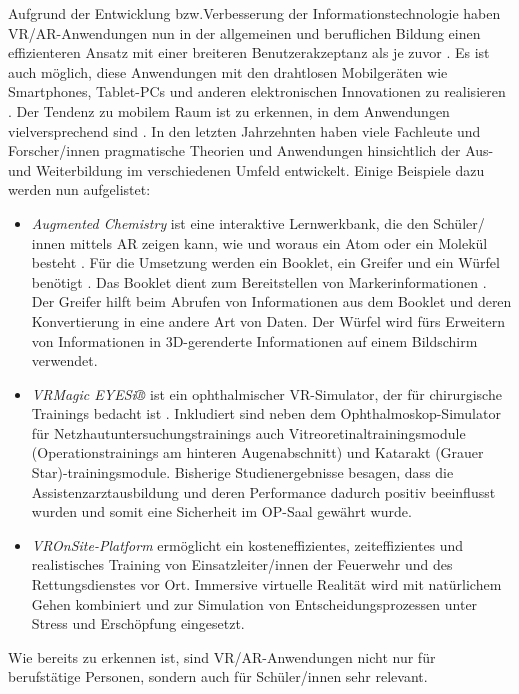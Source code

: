 \documentclass[deutsch]{llncs}
\begin{document}
Aufgrund der Entwicklung bzw.Verbesserung der Informationstechnologie haben VR/AR-Anwendungen nun in der allgemeinen und beruflichen Bildung einen effizienteren Ansatz mit einer breiteren Benutzerakzeptanz als je zuvor \cite{Edu}. Es ist auch möglich, diese Anwendungen mit den drahtlosen Mobilgeräten wie Smartphones, Tablet-PCs und anderen elektronischen Innovationen zu realisieren \cite{Edu}. Der Tendenz zu mobilem Raum ist zu erkennen, in dem Anwendungen vielversprechend sind \cite{Edu}.
In den letzten Jahrzehnten haben viele Fachleute und Forscher/innen pragmatische Theorien und Anwendungen hinsichtlich der Aus- und Weiterbildung im verschiedenen Umfeld entwickelt\cite{Edu}. Einige Beispiele dazu werden nun aufgelistet:
\begin{itemize}
\item \emph{Augmented Chemistry} ist eine interaktive Lernwerkbank, die den Schüler/ innen mittels AR zeigen kann, wie und woraus ein Atom oder ein Molekül besteht \cite{Edu}. Für die Umsetzung werden ein Booklet, ein Greifer und ein Würfel benötigt \cite{Edu}. Das Booklet dient zum Bereitstellen von Markerinformationen \cite{Edu}. Der Greifer hilft beim Abrufen von Informationen aus dem Booklet und deren Konvertierung in eine andere Art von Daten\cite{Edu}. Der Würfel wird fürs Erweitern von Informationen in 3D-gerenderte Informationen auf einem Bildschirm verwendet\cite{Edu}.
\item \emph{VRMagic EYESi®} ist ein ophthalmischer VR-Simulator, der für chirurgische Trainings bedacht ist \cite{augen}. Inkludiert sind neben dem Ophthalmoskop-Simulator für Netzhautuntersuchungstrainings auch Vitreoretinaltrainingsmodule (Operationstrainings am hinteren Augenabschnitt) und Katarakt (Grauer Star)-trainingsmodule\cite{augen}. Bisherige Studienergebnisse besagen, dass die Assistenzarztausbildung und deren Performance dadurch positiv beeinflusst wurden und somit eine Sicherheit im OP-Saal gewährt wurde\cite{augen}. 
\item \emph{VROnSite-Platform} ermöglicht ein kosteneffizientes, zeiteffizientes und realistisches Training von Einsatzleiter/innen der Feuerwehr und des Rettungsdienstes vor Ort\cite{Feuerwehr}. Immersive virtuelle Realität wird mit natürlichem Gehen kombiniert und zur Simulation von Entscheidungsprozessen unter Stress und Erschöpfung eingesetzt\cite{Feuerwehr}. 
\end{itemize}
Wie bereits zu erkennen ist, sind VR/AR-Anwendungen nicht nur für berufstätige Personen, sondern auch für Schüler/innen sehr relevant. 
\end{document}
